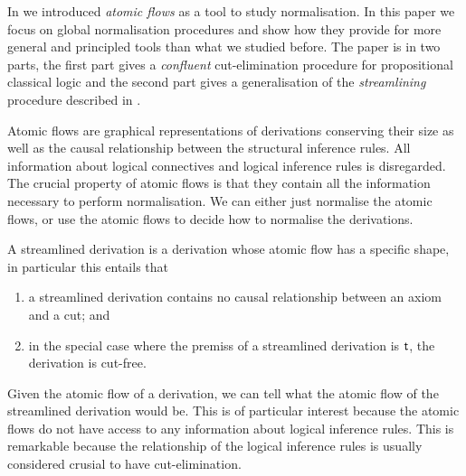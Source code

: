 \documentclass[a4paper]{amsart}
\theoremstyle{remark}
\theoremstyle{definition}
\newcommand{\Ale}[1]{{\color{red}\noindent {\bf A:} #1}}
\newcommand{\Tom}[1]{{\color{green}\noindent {\bf T:} #1}}
\renewcommand{\Ale}[1]{\relax}  %
\renewcommand{\Tom}[1]{\relax}  %
\begin{document}
\Ale{were the previous methods crap?}

\Tom{in my opinion the method shown here is a strict improvement, let me know if you know of any downsides (I might have forgotten)}

\Ale{global?}

In \cite{GuglGund:07:Normalis:lr} we introduced \emph{atomic flows} as a tool to study normalisation. In this paper we focus on global normalisation procedures and show how they provide for more general and principled tools than what we studied before. The paper is in two parts, the first part gives a \emph{confluent} cut-elimination procedure for propositional classical logic and the second part gives a generalisation of the \emph{streamlining} procedure described in \cite{GuglGund:07:Normalis:lr}.

\Ale{is the causual relationship known?}

Atomic flows are graphical representations of derivations conserving their size as well as the causal relationship between the structural inference rules. All information about logical connectives and logical inference rules is disregarded. The crucial property of atomic flows is that they contain all the information necessary to perform normalisation. We can either just normalise the atomic flows, or use the atomic flows to decide how to normalise the derivations.

\Ale{previous sentence, see hand written comments [could not read comment]}

A streamlined derivation is a derivation whose atomic flow has a speciﬁc shape, in particular this entails that

\begin{enumerate}
\item a streamlined derivation contains no causal relationship between an axiom and a cut; and
\item in the special case where the premiss of a streamlined derivation is $\mathsf t$, the derivation is cut-free.
\end{enumerate}

\Ale{causal relationship not understandable}

\Ale{put a picture}

\Tom{will do (later, when the text is finished)}

Given the atomic flow of a derivation, we can tell what the atomic flow of the streamlined derivation would be. This is of particular interest because the atomic flows do not have access to any information about logical inference rules. This is remarkable because the relationship of the logical inference rules is usually considered crusial to have cut-elimination.
\end{document}
